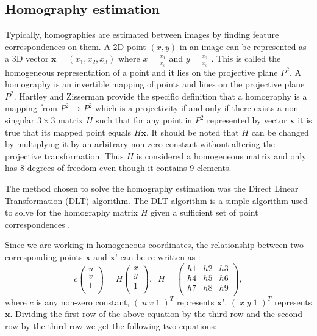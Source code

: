 
\subsection{Homography estimation} %
\label{sub:tracking_library_for_the_web:marker_less_tracking_algorithm:homography_estimation}

Typically, homographies are estimated between images by finding feature correspondences on them. A 2D point $(x,y)$ in an image can be represented as a 3D vector $\textbf{x} = (x_1, x_2, x_3)$ where $x = \frac{x_1}{x_3}$ and $y = \frac{x_2}{x_3}$ \cite{Homography2009}. This is called the homogeneous representation of a point and it lies on the projective plane $P^2$. A homography is an invertible mapping of points and lines on the projective plane $P^2$. Hartley and Zisserman \cite{Hartley2004} provide the specific definition that a homography is a mapping from $P^2$ → $P^2$ which is a projectivity if and only if there exists a non-singular $3\times3$ matrix $H$ such that for any point in $P^2$ represented by vector $\textbf{x}$ it is true that its mapped point equals $H\textbf{x}$. It should be noted that $H$ can be changed by multiplying it by an arbitrary non-zero constant without altering the projective transformation. Thus $H$ is considered a homogeneous matrix and only has $8$ degrees of freedom even though it contains $9$ elements.

The method chosen to solve the homography estimation was the Direct Linear Transformation (DLT) \cite{Impa2009,Hartley2004} algorithm. The DLT algorithm is a simple algorithm used to solve for the homography matrix $H$ given a sufficient set of point correspondences \cite{Homography2009}.

Since we are working in homogeneous coordinates, the relationship between two corresponding points $\textbf{x}$ and $\textbf{x'}$ can be re-written as \cite{Homography2009}:
$$c\begin{pmatrix}u\\ v\\ 1\\\end{pmatrix} = H\begin{pmatrix}x\\ y\\ 1\\\end{pmatrix}, \;\; H=\begin{pmatrix}h1 & h2 & h3\\ h4 & h5 & h6\\ h7 & h8 & h9\\\end{pmatrix},$$
where $c$ is any non-zero constant, $(\; u \; v \; 1 \;)^T$ represents $\textbf{x'}$, $(\; x \; y \; 1 \;)^T$ represents $\textbf{x}$. Dividing the first row of the above equation by the third row and the second row by the third row we get the following two equations:

